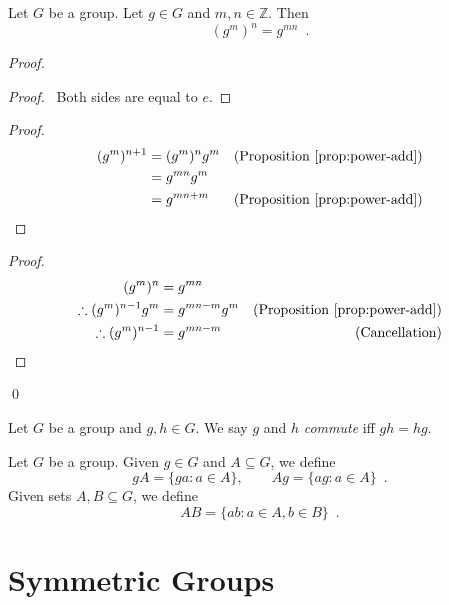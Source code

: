 \begin{prop}
    \label{prop:power-mult}
    Let $G$ be a group. Let $g \in G$ and $m,n \in \mathbb{Z}$. Then
    \[ (g^m)^n = g^{mn} \enspace . \]
\end{prop}

\begin{proof}
    \pf
    \begin{proof}
        \pf\ Both sides are equal to $e$.
    \end{proof}
    \begin{proof}
        \pf
        \begin{align*}
            (g^m)^{n+1} & = (g^m)^n g^m & (\text{Proposition \ref{prop:power-add}}) \\
                        & = g^{mn} g^m                                              \\
                        & = g^{mn + m}  & (\text{Proposition \ref{prop:power-add}})
        \end{align*}
    \end{proof}
    \begin{proof}
        \pf
        \begin{align*}
            (g^m)^n                    & = g^{mn}                                                   \\
            \therefore (g^m)^{n-1} g^m & = g^{mn-m} g^m & (\text{Proposition \ref{prop:power-add}}) \\
            \therefore (g^m)^{n-1}     & = g^{mn-m}     & (\text{Cancellation})
        \end{align*}
    \end{proof}
    \qed
\end{proof}

\begin{df}[Commute]
    Let $G$ be a group and $g,h \in G$. We say $g$ and $h$ \emph{commute} iff $gh = hg$.
\end{df}

\begin{df}
Let $G$ be a group. Given $g \in G$ and $A \subseteq G$, we define
\[ gA = \{ ga : a \in A \}, \qquad Ag = \{ ag : a \in A \} \enspace . \]
Given sets $A,B \subseteq G$, we define
\[ AB = \{ ab : a \in A, b \in B \} \enspace . \]
\end{df}

\section{Symmetric Groups}

